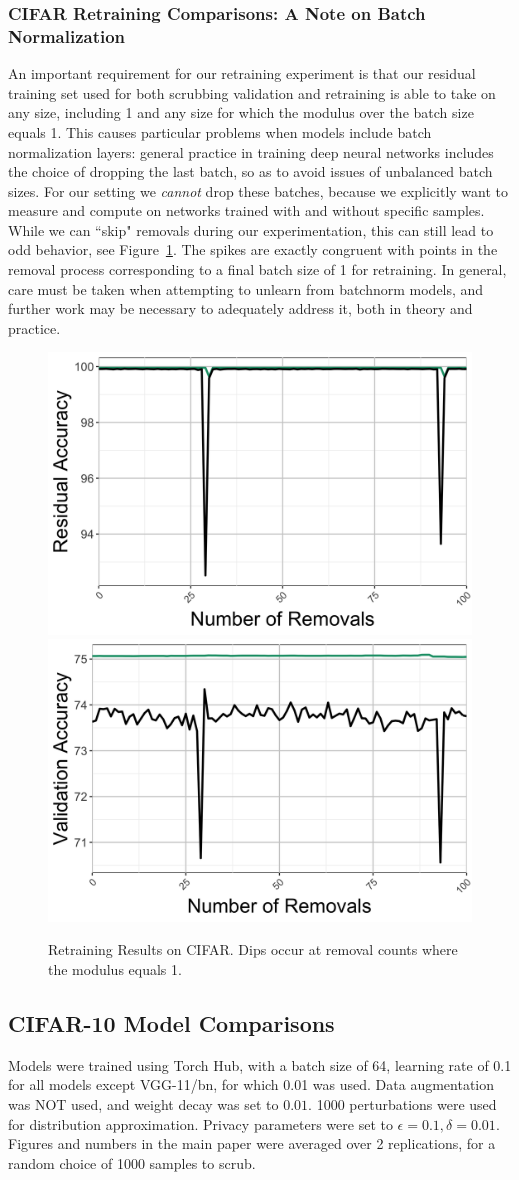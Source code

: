 \subsubsection{CIFAR Retraining Comparisons: A Note on Batch Normalization}
An important requirement for our retraining experiment is that our residual training set used for both scrubbing validation and retraining is able to take on any size, including 1 and any size for which the modulus over the batch size equals 1. This causes particular problems when models include batch normalization layers: general practice in training deep neural networks includes the choice of dropping the last batch, so as to avoid issues of unbalanced batch sizes. For our setting we \textit{cannot} drop these batches, because we explicitly want to measure and compute on networks trained with and without specific samples. While we can ``skip" removals during our experimentation, this can still lead to odd behavior, see Figure~\ref{fig:cifarretrain}. The spikes are exactly congruent with points in the removal process corresponding to a final batch size of 1 for retraining. In general, care must be taken when attempting to unlearn from batchnorm models, and further work may be necessary to adequately address it, both in theory and practice.
\begin{figure}
    \centering
    \includegraphics[width=0.4\columnwidth]{5_unlearn/figs/retrain/CIFAR_Retrain_Residual_Accs.png}
    \includegraphics[width=0.4\columnwidth]{5_unlearn/figs/retrain/CIFAR_Retrain_Validation_Accs.png}
    \caption{Retraining Results on CIFAR. Dips occur at removal counts where the modulus equals 1.}
    \label{fig:cifarretrain}
\end{figure}

\subsection{CIFAR-10 Model Comparisons}
Models were trained using Torch Hub, with a batch size of 64, learning rate of 0.1 for all models except VGG-11/bn, for which 0.01 was used. Data augmentation was NOT used, and weight decay was set to $0.01$.
1000 perturbations were used for distribution approximation. Privacy parameters were set to $\epsilon=0.1, \delta=0.01$.
Figures and numbers in the main paper were averaged over 2 replications, for a random choice of 1000 samples to scrub.

